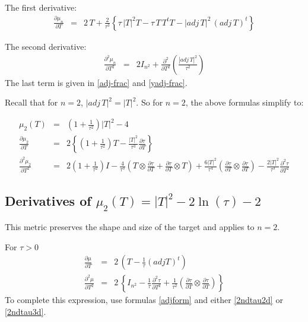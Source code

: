 \documentclass{report}
\begin{document}
\noindent The first derivative:
\begin{eqnarray}
\frac{\partial \mu_n}{\partial T} & = & 2 \, T + \frac{2}{\tau^3} \left\{ \tau \, |T|^2 T - \tau \, T \, T^t T - |adj \, T|^2 \, (adj \, T)^t \right\}
\end{eqnarray}

\noindent The second derivative:
\begin{eqnarray}
\frac{\partial^2 \mu_n}{\partial T^2} & = & 2 I_{n^2} + \frac{\partial^2}{\partial T^2} \left( \frac{|adj \, T|^2}{\tau^2} \right)
\end{eqnarray}
The last term is given in \ref{adj-frac} and \ref{yadj-frac}. \newline

\noindent Recall that for $n=2$, $|adj \, T|^2=|T|^2$. So for $n=2$, the above formulas simplify to:

\begin{eqnarray}
\mu_2(T) & = & \left(1 + \frac{1}{\tau^2}\right) |T|^2 - 4 \\
\frac{ \partial \mu_2 }{ \partial T } & = & 2 \left\{ 
          \left(1 + \frac{1}{\tau^2}\right) T - \frac{|T|^2}{\tau^3} 
          \frac{\partial \tau}{\partial T} \right\} \\
\nonumber
\frac{\partial^2 \mu_2}{\partial T^2} & = &
          2 \left(1 + \frac{1}{\tau^2}\right) I -
          \frac{4}{\tau^3}\left( T \otimes \frac{\partial \tau}{\partial T} +
                                 \frac{\partial \tau}{\partial T} \otimes T \right) +
          \frac{6 |T|^2}{\tau^4}\left( \frac{\partial \tau}{\partial T} \otimes
                                       \frac{\partial \tau}{\partial T} \right) -
          \frac{2 |T|^2}{\tau^3}\frac{\partial^2 \tau}{\partial T^2}
\end{eqnarray}

\subsection{Derivatives of $\mu_2(T)=|T|^2 - 2 \ln(\tau) - 2$ \label{ss+22d} }

\noindent This metric preserves the shape and size of the target and applies
to $n=2$. \newline

\noindent For $\tau>0$
\begin{eqnarray}
\frac{\partial \mu}{\partial T} & = & 2 \, \left( T - \frac{1}{\tau} (adj T)^t \right) \\
\frac{\partial^2 \mu}{\partial T^2} & = & 2 \, \left\{ I_{n^2}  - \frac{1}{\tau} \frac{\partial^2 \tau}{\partial T^2} + \frac{1}{\tau^2} \left( \frac{\partial \tau}{\partial T} \otimes \frac{\partial \tau}{\partial T} \right) \right\}
\end{eqnarray}
To complete this expression, use formulas \ref{adjform} and either 
\ref{2ndtau2d} or \ref{2ndtau3d}. \newline
\end{document}
